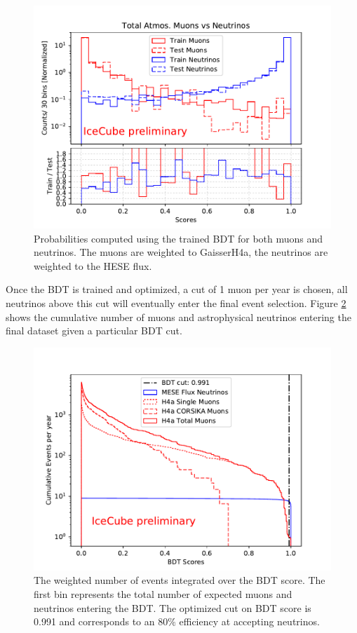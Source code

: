 \documentclass{PoS}
\begin{document}
\begin{figure}[h!]
\centering 
    \includegraphics[width=0.85\linewidth]{bdt_scores_best_muongun_resampled_corsika_no_weights_xgboost_model.pdf}
    \caption{Probabilities computed using the trained BDT for both muons and neutrinos. The muons are weighted to GaisserH4a, the neutrinos are weighted to the HESE flux.}
\label{fig:BDToutputs}
\end{figure}

Once the BDT is trained and optimized, a cut of 1 muon per year is chosen, all neutrinos above this cut will eventually enter the final event selection. Figure \ref{fig:BDT_cuts} shows the cumulative number of muons and astrophysical neutrinos entering the final dataset given a particular BDT cut.

\begin{figure}[h!]
\centering 
    \includegraphics[width=0.85\linewidth]{real_bdt_cut_cumulative_plot.pdf}
    \caption{The weighted number of events integrated over the BDT score. The first bin represents the total number of expected muons and neutrinos entering the BDT. The optimized cut on BDT score is 0.991 and corresponds to an 80$\%$ efficiency at accepting neutrinos.}
\label{fig:BDT_cuts}
\end{figure}
\end{document}

